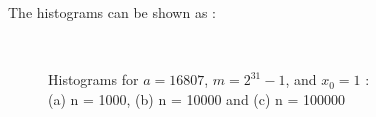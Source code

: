 \documentclass[11pt]{article}
\begin{document}
The histograms can be shown as :

\begin{figure}[H]
  \centering
  \captionsetup{justification=centering}
  \hspace{10mm}
  \\
    \caption{Histograms for $a = 16807$, $m = 2^{31} - 1$, and $x_{0} = 1$ :\\(a) n = 1000, (b) n = 10000 and (c) n = 100000}
\end{figure}
\end{document}
